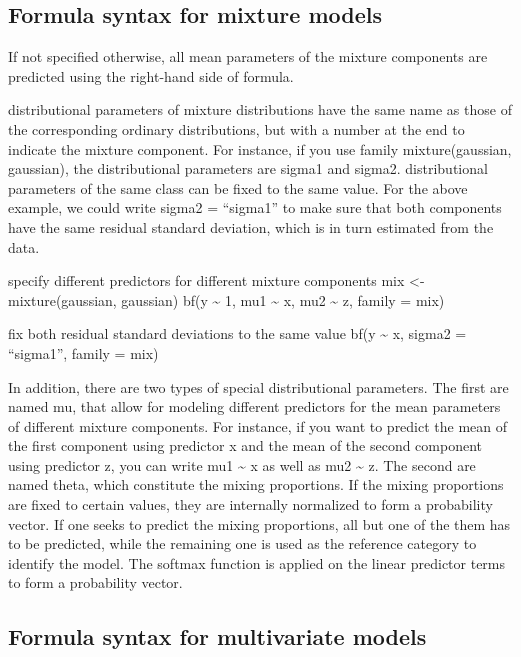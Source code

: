 \documentclass[]{book}
\begin{document}
\subsection{Formula syntax for mixture
models}\label{formula-syntax-for-mixture-models}

If not specified otherwise, all mean parameters of the mixture
components are predicted using the right-hand side of formula.

distributional parameters of mixture distributions have the same name as
those of the corresponding ordinary distributions, but with a number at
the end to indicate the mixture component. For instance, if you use
family mixture(gaussian, gaussian), the distributional parameters are
sigma1 and sigma2. distributional parameters of the same class can be
fixed to the same value. For the above example, we could write sigma2 =
``sigma1'' to make sure that both components have the same residual
standard deviation, which is in turn estimated from the data.

specify different predictors for different mixture components mix
\textless{}- mixture(gaussian, gaussian) bf(y \textasciitilde{} 1, mu1
\textasciitilde{} x, mu2 \textasciitilde{} z, family = mix)

fix both residual standard deviations to the same value bf(y
\textasciitilde{} x, sigma2 = ``sigma1'', family = mix)

In addition, there are two types of special distributional parameters.
The first are named mu, that allow for modeling different predictors for
the mean parameters of different mixture components. For instance, if
you want to predict the mean of the first component using predictor x
and the mean of the second component using predictor z, you can write
mu1 \textasciitilde{} x as well as mu2 \textasciitilde{} z. The second
are named theta, which constitute the mixing proportions. If the mixing
proportions are fixed to certain values, they are internally normalized
to form a probability vector. If one seeks to predict the mixing
proportions, all but one of the them has to be predicted, while the
remaining one is used as the reference category to identify the model.
The softmax function is applied on the linear predictor terms to form a
probability vector.

\subsection{Formula syntax for multivariate
models}\label{formula-syntax-for-multivariate-models}
\end{document}
